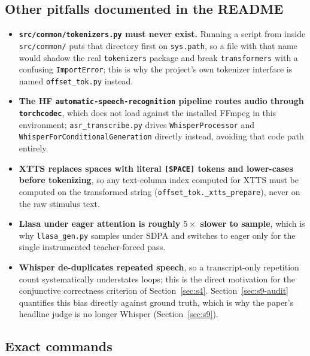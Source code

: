 \documentclass[11pt]{article}
\begin{document}
\subsection{Other pitfalls documented in the README}

\begin{itemize}
\item \textbf{\texttt{src/common/tokenizers.py} must never exist.} Running a
  script from inside \texttt{src/common/} puts that directory first on
  \texttt{sys.path}, so a file with that name would shadow the real
  \texttt{tokenizers} package and break \texttt{transformers} with a
  confusing \texttt{ImportError}; this is why the project's own tokenizer
  interface is named \texttt{offset\_tok.py} instead.
\item \textbf{The HF \texttt{automatic-speech-recognition} pipeline routes
  audio through \texttt{torchcodec}}, which does not load against the
  installed FFmpeg in this environment; \texttt{asr\_transcribe.py} drives
  \texttt{WhisperProcessor} and \texttt{WhisperForConditionalGeneration}
  directly instead, avoiding that code path entirely.
\item \textbf{XTTS replaces spaces with literal \texttt{[SPACE]} tokens and
  lower-cases before tokenizing}, so any text-column index computed for XTTS
  must be computed on the transformed string
  (\texttt{offset\_tok.\_xtts\_prepare}), never on the raw stimulus text.
\item \textbf{Llasa under eager attention is roughly $5\times$ slower to
  sample}, which is why \texttt{llasa\_gen.py} samples under SDPA and
  switches to eager only for the single instrumented teacher-forced pass.
\item \textbf{Whisper de-duplicates repeated speech}, so a transcript-only
  repetition count systematically understates loops; this is the direct
  motivation for the conjunctive correctness criterion of
  Section~\ref{sec:s4}. Section~\ref{sec:s9-audit} quantifies this bias
  directly against ground truth, which is why the paper's headline judge is
  no longer Whisper (Section~\ref{sec:s9}).
\end{itemize}

\subsection{Exact commands}
\end{document}
